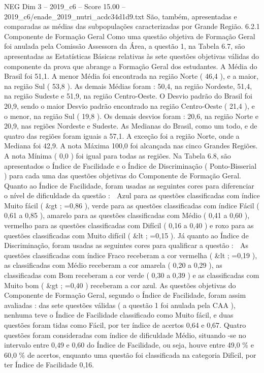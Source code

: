\begin{textsample}{NEG Dim 3 – 2019\_c6 – Score 15.00 – 2019\_c6/enade\_2019\_nutri\_acdc34d1d9.txt}
São, também, apresentadas e comparadas as médias das subpopulações caracterizadas por Grande Região. 6.2.1 Componente de Formação Geral Como uma questão objetiva de Formação Geral foi anulada pela Comissão Assessora da Área, a questão 1, na Tabela 6.7, são apresentadas as Estatísticas Básicas relativas às sete questões objetivas válidas do componente da prova que abrange a Formação Geral dos estudantes.
A Média do Brasil foi 51,1.
A menor Média foi encontrada na região Norte ( 46,4 ), e a maior, na região Sul ( 53,8 ).
As demais Médias foram : 50,4, na região Nordeste, 51,4, na região Sudeste e 51,9, na região Centro-Oeste.
O Desvio padrão do Brasil foi 20,9, sendo o maior Desvio padrão encontrado na região Centro-Oeste ( 21,4 ), e o menor, na região Sul ( 19,8 ).
Os demais desvios foram : 20,6, na região Norte e 20,9, nas regiões Nordeste e Sudeste.
As Medianas do Brasil, como um todo, e de quatro das regiões foram iguais a 57,1.
A exceção foi a região Norte, onde a Mediana foi 42,9.
A nota Máxima 100,0 foi alcançada nas cinco Grandes Regiões.
A nota Mínima ( 0,0 ) foi igual para todas as regiões.
Na Tabela 6.8, são apresentados o Índice de Facilidade e o Índice de Discriminação ( Ponto-Bisserial ) para cada uma das questões objetivas do Componente de Formação Geral.
Quanto ao Índice de Facilidade, foram usadas as seguintes cores para diferenciar o nível de dificuldade da questão :  Azul para as questões classificadas com índice Muito fácil ( \&gt ; =0,86 ), verde para as questões classificadas com índice Fácil ( 0,61 a 0,85 ), amarelo para as questões classificadas com Médio ( 0,41 a 0,60 ), vermelho para as questões classificadas com Difícil ( 0,16 a 0,40 ) e roxo para as questões classificadas com Muito difícil ( \&lt ; =0,15 ).
Já quanto ao Índice de Discriminação, foram usadas as seguintes cores para qualificar a questão :  As questões classificadas com índice Fraco receberam a cor vermelha ( \&lt ; =0,19 ), as classificadas com Médio receberam a cor amarela ( 0,20 a 0,29 ), as classificadas com Bom receberam a cor verde ( 0,30 a 0,39 ) e as classificadas com Muito bom ( \&gt ; =0,40 ) receberam a cor azul.
As questões objetivas do Componente de Formação Geral, segundo o Índice de Facilidade, foram assim avaliadas : das sete questões válidas ( a questão 1 foi anulada pela CAA ), nenhuma teve o Índice de Facilidade classificado como Muito fácil, e duas questões foram tidas como Fácil, por ter índice de acertos 0,64 e 0,67.
Quatro questões foram consideradas com índice de dificuldade Médio, situando -se no intervalo entre 0,49 e 0,60 do Índice de Facilidade, ou seja, houve entre 49,0 \% e 60,0 \% de acertos, enquanto uma questão foi classificada na categoria Difícil, por ter Índice de Facilidade 0,16.

\end{textsample}
